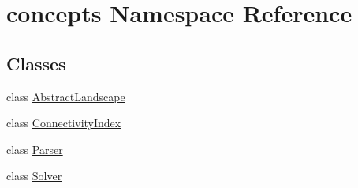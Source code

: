 \hypertarget{namespaceconcepts}{}\section{concepts Namespace Reference}
\label{namespaceconcepts}
\subsection*{Classes}
\begin{DoxyCompactItemize}
\item 
class \hyperlink{classconcepts_1_1_abstract_landscape}{Abstract\+Landscape}
\item 
class \hyperlink{classconcepts_1_1_connectivity_index}{Connectivity\+Index}
\item 
class \hyperlink{classconcepts_1_1_parser}{Parser}
\item 
class \hyperlink{classconcepts_1_1_solver}{Solver}
\end{DoxyCompactItemize}
